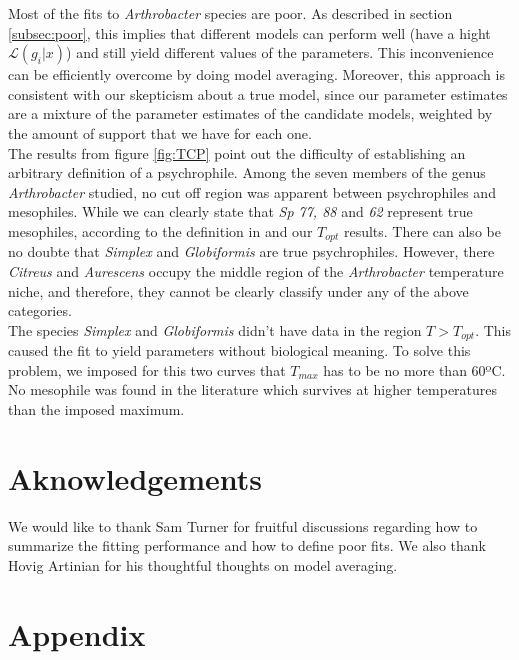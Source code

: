 \documentclass[titlepage,11pt]{article}
\begin{document}
\begin{linenumbers}
		Most of the fits to \textit{Arthrobacter} species are poor. As described in section \ref{subsec:poor}, this implies that different models can perform well (have a hight $ \mathcal{L}(g_i|x) $) and still yield different values of the parameters. This inconvenience can be efficiently overcome by doing model averaging. Moreover, this approach is consistent with our skepticism about a true model, since our parameter estimates are a mixture of the parameter estimates of the candidate models, weighted by the amount of support that we have for each one. \\
		The results from figure \ref{fig:TCP} point out the difficulty of establishing an arbitrary definition of a psychrophile. Among the seven members of the genus \textit{Arthrobacter} studied, no cut off region was apparent between  psychrophiles and mesophiles. While we can clearly state that \textit{Sp 77, 88} and \textit{62} represent true mesophiles, according to the definition in \cite{INGRAHAM1958} and our $ T_{opt} $ results. There can also be no doubte that \textit{Simplex} and \textit{Globiformis} are true psychrophiles. However, there \textit{Citreus} and \textit{Aurescens} occupy the middle region of the \textit{Arthrobacter} temperature niche, and therefore, they cannot be clearly classify under any of the above categories. \\
		The species \textit{Simplex} and \textit{Globiformis} didn't have data in the region $ T > T_{opt} $. This caused the fit to yield parameters without biological meaning. To solve this problem, we imposed for this two curves that $ T_{max} $ has to be no more than 60ºC. No mesophile was found in the literature \cite{Schiraldi2014} which survives at higher temperatures than the imposed maximum. \\
		\section{Aknowledgements}
		We would like to thank Sam Turner for fruitful discussions regarding how to summarize the fitting performance and how to define poor fits. We also thank Hovig Artinian for his thoughtful thoughts on model averaging. 
		\newpage
		\section{Appendix}

\end{linenumbers}
\end{document}
